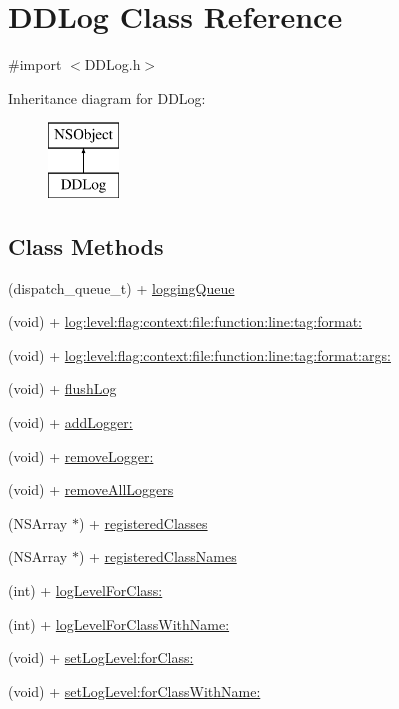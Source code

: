 \hypertarget{interface_d_d_log}{\section{D\-D\-Log Class Reference}
\label{interface_d_d_log}
}


{\ttfamily \#import $<$D\-D\-Log.\-h$>$}

Inheritance diagram for D\-D\-Log\-:\begin{figure}[H]
\begin{center}
\leavevmode
\includegraphics[height=2.000000cm]{interface_d_d_log}
\end{center}
\end{figure}
\subsection*{Class Methods}
\begin{DoxyCompactItemize}
\item 
(dispatch\-\_\-queue\-\_\-t) + \hyperlink{interface_d_d_log_a8eff5a7031d7532a7b0b7fe0d2e1cc11}{logging\-Queue}
\item 
(void) + \hyperlink{interface_d_d_log_a535b56a0cc9c0c4be95f6f221ef05ebd}{log\-:level\-:flag\-:context\-:file\-:function\-:line\-:tag\-:format\-:}
\item 
(void) + \hyperlink{interface_d_d_log_a975849e87586b63f2eae80f67cc3bc96}{log\-:level\-:flag\-:context\-:file\-:function\-:line\-:tag\-:format\-:args\-:}
\item 
(void) + \hyperlink{interface_d_d_log_a55c377027924a9afa9079bec8a616145}{flush\-Log}
\item 
(void) + \hyperlink{interface_d_d_log_a8ef73bdc10ce737fe7bb810b31fb2fb7}{add\-Logger\-:}
\item 
(void) + \hyperlink{interface_d_d_log_a5c29863af8e5e8bee60b1c213b5e383c}{remove\-Logger\-:}
\item 
(void) + \hyperlink{interface_d_d_log_af2f45435aea37e7132fb6f10a50c5a45}{remove\-All\-Loggers}
\item 
(N\-S\-Array $\ast$) + \hyperlink{interface_d_d_log_a183baa489d76c82ab6def69d521ee60b}{registered\-Classes}
\item 
(N\-S\-Array $\ast$) + \hyperlink{interface_d_d_log_aea7f5dfba1bc3125d40013706ecae5b0}{registered\-Class\-Names}
\item 
(int) + \hyperlink{interface_d_d_log_a77eb6a81906160194a9c8e71f9dec891}{log\-Level\-For\-Class\-:}
\item 
(int) + \hyperlink{interface_d_d_log_a346773097e8165b429ce221d562f4efa}{log\-Level\-For\-Class\-With\-Name\-:}
\item 
(void) + \hyperlink{interface_d_d_log_a1803937d7c00897026e223fc6a7a6131}{set\-Log\-Level\-:for\-Class\-:}
\item 
(void) + \hyperlink{interface_d_d_log_af4e54a953ceda54cfac3552eb86ded12}{set\-Log\-Level\-:for\-Class\-With\-Name\-:}
\end{DoxyCompactItemize}


